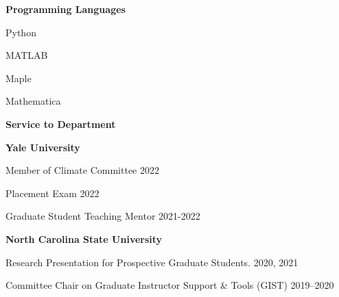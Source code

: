 \documentclass{article}
\begin{document}
%
%
%
%
%
%
%
%
%
%
%
%
%

%
%
\bigskip
\bigskip

\textsf{\textbf{\Large Programming Languages} \hrulefill}



\medskip
Python

\medskip
MATLAB

\medskip
Maple

\medskip
Mathematica

\bigskip
\bigskip

\textsf{\textbf{\Large Service to Department} \hrulefill}

\medskip

\textsf{\textbf{Yale University}}

\medskip
Member of Climate Committee
\hfill 2022

\medskip
Placement Exam 
\hfill 2022

\medskip
Graduate Student Teaching Mentor \hfill 2021-2022

\bigskip

\textsf{\textbf{North Carolina State University}}

\medskip
Research Presentation for Prospective Graduate Students.
\hfill 2020, 2021

\medskip
Committee Chair on Graduate Instructor Support \& Tools (GIST)
\hfill 2019--2020
\end{document}
